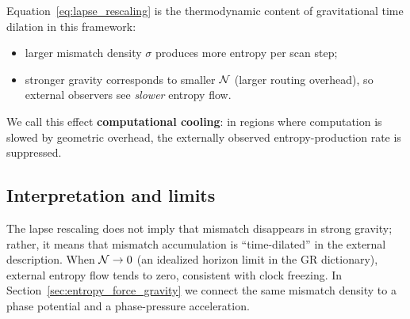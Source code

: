 \noindent Equation~\eqref{eq:lapse_rescaling} is the thermodynamic content of gravitational time dilation in this framework:
\begin{itemize}
  \item larger mismatch density $\sigma$ produces more entropy per scan step;
  \item stronger gravity corresponds to smaller $\mathcal{N}$ (larger routing overhead), so external observers see \emph{slower} entropy flow.
\end{itemize}
We call this effect \textbf{computational cooling}: in regions where computation is slowed by geometric overhead, the externally observed entropy-production rate is suppressed.

\subsection{Interpretation and limits}

The lapse rescaling does not imply that mismatch disappears in strong gravity; rather, it means that mismatch accumulation is ``time-dilated'' in the external description. When $\mathcal{N}\to 0$ (an idealized horizon limit in the GR dictionary), external entropy flow tends to zero, consistent with clock freezing. In Section~\ref{sec:entropy_force_gravity} we connect the same mismatch density to a phase potential and a phase-pressure acceleration.



